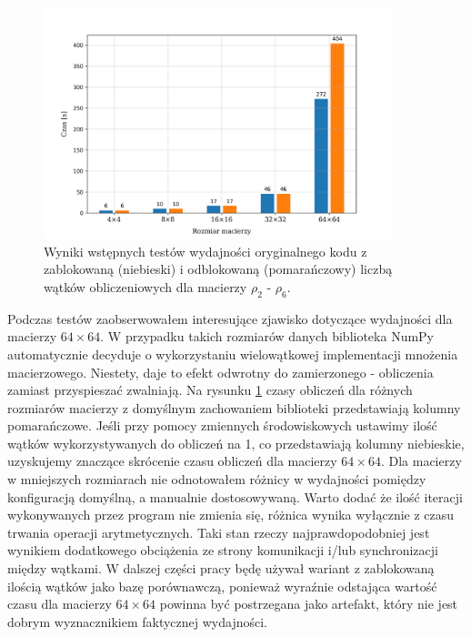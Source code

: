 \documentclass[10pt, a4paper]{article}
\begin{document}
\begin{sloppypar}
    \FloatBarrier
    \begin{figure}[ht]
      \centering
      \includegraphics[width=0.9\textwidth]{"resources/benchmark_1/plot.png"}
      \caption{Wyniki wstępnych testów wydajności oryginalnego kodu z zablokowaną (niebieski) i odblokowaną (pomarańczowy) liczbą wątków obliczeniowych dla macierzy $\rho
      _{2}$ - $\rho_{6}$.}
      \label{pre-perf}
    \end{figure}
    \FloatBarrier

    Podczas testów zaobserwowałem interesujące zjawisko dotyczące wydajności dla
    macierzy $64\times64$. W przypadku takich rozmiarów danych biblioteka NumPy automatycznie
    decyduje o wykorzystaniu wielowątkowej implementacji mnożenia macierzowego. Niestety,
    daje to efekt odwrotny do zamierzonego - obliczenia zamiast przyspieszać zwalniają.
    Na rysunku \ref{pre-perf} czasy obliczeń dla różnych rozmiarów macierzy z domyślnym
    zachowaniem biblioteki przedstawiają kolumny pomarańczowe. Jeśli przy pomocy zmiennych
    środowiskowych ustawimy ilość wątków wykorzystywanych do obliczeń na 1, co
    przedstawiają kolumny niebieskie, uzyskujemy znaczące skrócenie czasu obliczeń dla macierzy
    $64\times64$. Dla macierzy w mniejszych rozmiarach nie odnotowałem różnicy w
    wydajności pomiędzy konfiguracją domyślną, a manualnie dostosowywaną. Warto dodać że
    ilość iteracji wykonywanych przez program nie zmienia się, różnica wynika wyłącznie z
    czasu trwania operacji arytmetycznych. Taki stan rzeczy najprawdopodobniej jest
    wynikiem dodatkowego obciążenia ze strony komunikacji i/lub synchronizacji między
    wątkami. W dalszej części pracy będę używał wariant z zablokowaną ilością wątków jako
    bazę porównawczą, ponieważ wyraźnie odstająca wartość czasu dla macierzy
    $64\times64$ powinna być postrzegana jako artefakt, który nie jest dobrym wyznacznikiem
    faktycznej wydajności.


\end{sloppypar}
\end{document}
